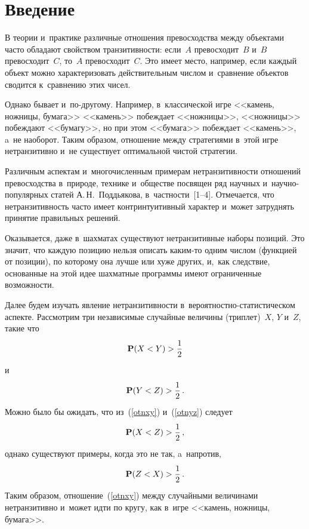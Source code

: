 \thispagestyle{headings}

\begin{multicols}{2}

\label{st\stat}

\section{Введение}

В теории и~практике различные отношения превосходства между объектами часто обладают
свойством транзитивности: если~$A$ превосходит~$B$ и~$B$ превосходит~$C$, то~$A$ 
превосходит~$C$.
Это имеет место, например, если каждый объект можно характеризовать действительным 
числом и~сравнение объектов сводится к~сравнению этих чисел.

Однако бывает и~по-другому. Например, в~классической игре <<камень, ножницы, бумага>> 
<<камень>> побеждает <<ножницы>>, <<ножницы>> побеждают <<бумагу>>, но при этом 
<<бумага>> побеждает <<камень>>, a~не наоборот.
Таким образом, отношение между стратегиями в~этой игре нетранзитивно и~не 
существует оптимальной чистой стратегии.

Различным аспектам и~многочисленным примерам нетранзитивности отношений 
превосходства в~природе, технике и~обществе посвящен ряд научных 
и~на\-уч\-но-по\-пу\-ляр\-ных статей А.\,Н.~Поддьякова, в~частности~[1--4].
Отмечается, что нетранзитивность часто имеет контринтуитивный характер и~может 
затруднять принятие правильных решений.

Оказывается, даже в~шахматах существуют нетранзитивные наборы позиций. 
Это значит, что каждую
позицию нельзя описать ка\-ким-то одним числом (функцией от позиции), 
по которому она лучше или хуже других, и,~как следствие, основанные на 
этой идее шахматные программы имеют ограниченные возможности.

Далее будем изучать явление нетранзитивности в~ве\-ро\-ят\-но\-ст\-но-ста\-ти\-сти\-че\-ском аспекте.
Рас\-смот\-рим три независимые случайные величины (триплет)~$X$, $Y$ и~$Z$, такие что
\begin{equation}
\label{otnxy}
\mathbf{P}(X<Y)>\displaystyle\frac{\displaystyle 1\mathstrut}{\displaystyle 2\mathstrut}
\end{equation}
и
\begin{equation}\label{otnyz}
\mathbf{P}(Y<Z)>\displaystyle\frac{\displaystyle 1\mathstrut}{\displaystyle 2\mathstrut}\,.
\end{equation}
Можно было бы ожидать, что из~(\ref{otnxy}) и~(\ref{otnyz}) следует
$$
\mathbf{P}(X<Z)>\displaystyle\frac{\displaystyle 1\mathstrut}{\displaystyle 2\mathstrut}\,,
$$
однако существуют примеры, когда это не так, a~напротив,
\begin{equation*}
\mathbf{P}(Z<X)>\displaystyle\frac{\displaystyle 1\mathstrut}{\displaystyle 2\mathstrut}\,.
\end{equation*}
Таким образом, отношение~(\ref{otnxy}) между случайными величинами нетранзитивно 
и~может идти по кругу, как в~игре <<камень, ножницы, бумага>>.


\end{multicols}
